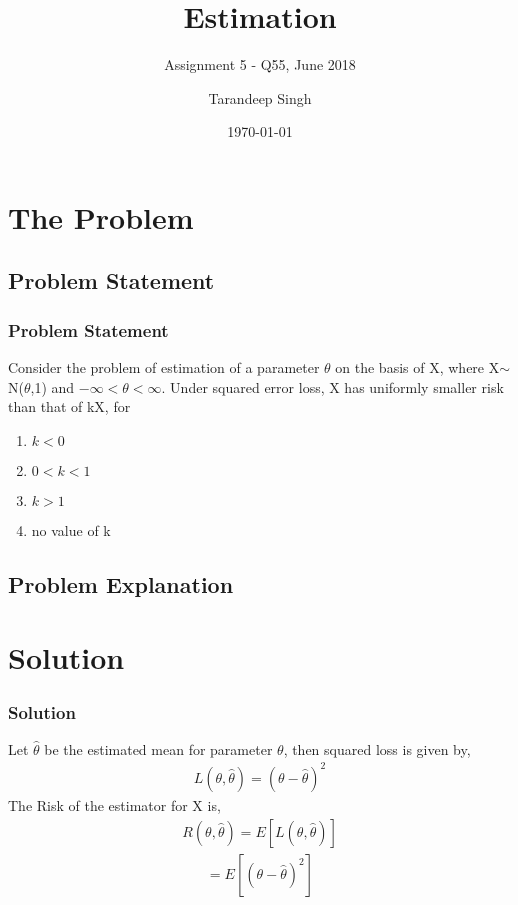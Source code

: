 \documentclass{beamer}
\title{Estimation}
\subtitle{Assignment 5 - Q55, June 2018}
\author{Tarandeep Singh}
\institute{IIT Hyderabad}
\date{\today}
\begin{document}
\begin{frame}
\titlepage
\end{frame}
\begin{comment}
\section{Introduction}


\end{comment}
\section{The Problem}
\subsection{Problem Statement}

\begin{frame}
\frametitle{Problem Statement}
Consider the problem of estimation of a parameter $\theta$ on the basis of X, where X$\sim$N($\theta$,1) and $-\infty<\theta<\infty$. Under squared error loss, X has uniformly smaller risk than that of kX, for
\begin{enumerate}
\item $k<0$
\item $0<k<1$
\item $k>1$
\item no value of k
\end{enumerate}
\end{frame}



\subsection{Problem Explanation}

\section{Solution}
\begin{frame}
\frametitle{Solution}
Let $\hat{\theta}$ be the estimated mean for parameter $\theta$, then squared loss is given by,
\begin{align}
    L(\theta,\hat{\theta}) = (\theta - \hat{\theta})^2
\end{align}
The Risk of the estimator for X is,
\begin{align}
    R(\theta,\hat{\theta}) = E[L(\theta,\hat{\theta})]
\end{align}
\begin{align}
    = E[(\theta - \hat{\theta})^2] 
\end{align}
\end{frame}
\end{document}
